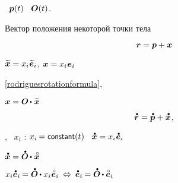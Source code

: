    ~${\bm{p}(t)}$ ~${\bm{O}(t)}$.

\foreignlanguage{russian}{Вектор положения некоторой точки тела}

\nopagebreak\vspace{-0.2em}\begin{equation}\label{completelyrigidbody.locationvectorofanypointdecomposed}
\bm{r} = \bm{p} + \bm{x}
\end{equation}

${\widetilde{\bm{x}} = x_i \hspace{.1ex} \widetilde{\bm{e}}_i}$,
${\bm{x} = x_i \hspace{.1ex} \bm{e}_i}$

\eqref{rodriguesrotationformula}, 

${\bm{x} = \rotationtensor \hspace{-0.15ex} \dotp \hspace{.1ex} \widetilde{\bm{x}}}$

\begin{equation*}
\mathdotabove{\locationvector} = \mathdotabove{\positionofthepole} + \mathdotabove{\bm{x}}
\hspace{.1ex} ,
\end{equation*}

, ~${x_i}$ :
${x_i \hspace{-0.16ex} = \constant(t)}$ ~${\mathdotabove{\bm{x}} = x_i \hspace{.1ex} \mathdotabove{\bm{e}}_i}$

${\mathdotabove{\bm{x}} = \mathdotabove{\rotationtensor} \hspace{-0.15ex} \dotp \hspace{.1ex} \mathcircabove{\bm{x}}}$

${x_i \mathdotabove{\bm{e}}_i \hspace{-0.12ex} = \mathdotabove{\rotationtensor} \hspace{-0.15ex} \dotp x_i \hspace{.1ex} \mathcircabove{\bm{e}}_i
\:\Leftrightarrow\:
\mathdotabove{\bm{e}}_i \hspace{-0.12ex} = \mathdotabove{\rotationtensor} \hspace{-0.15ex} \dotp \mathcircabove{\bm{e}}_i}$

